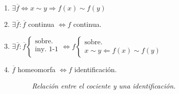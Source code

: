 \begin{prop}
\begin{enumerate}
    \item $\exists \overline{f} \Leftrightarrow x \sim y \Rightarrow f\left( x \right) \sim f\left( y \right)$
    \item $\exists \overline{f} : \overline{f}$ continua $\Leftrightarrow f$ continua.
    \item $\exists \overline{f}: \overline{f} \begin{cases}
        \text{sobre. }\\ 
        \text{iny. 1-1}\\ 
    \end{cases} \Leftrightarrow f \begin{cases}
        \text{sobre.}\\ 
        x \sim y \Leftarrow f \left( x \right) \sim f \left( y \right)
    \end{cases}$

    \item $\overline{f}$ homeomorfa $\Leftrightarrow f$ identificación.
    \begin{figure}[H]
        \centering
        \caption{\textit{Relación entre el cociente y una identificación.}}
        \label{fig:relacion_cociente_identificacion}
    \end{figure}
\end{enumerate} 
\end{prop}
